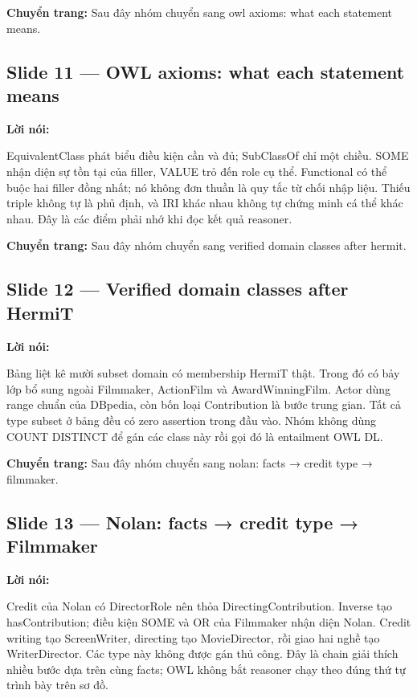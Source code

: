 \documentclass[
  11pt,
]{article}
\begin{document}
\textbf{Chuyển trang:} Sau đây nhóm chuyển sang owl axioms: what each
statement means.

\subsection{Slide 11 --- OWL axioms: what each statement
means}\label{slide-11-owl-axioms-what-each-statement-means}

\textbf{Lời nói:}

Equivale\allowbreak{}nt\allowbreak{}Class phát biểu điều kiện cần và đủ;
SubClassOf chỉ một chiều. SOME nhận diện sự tồn tại của filler, VALUE
trỏ đến role cụ thể. Functional có thể buộc hai filler đồng nhất; nó
không đơn thuần là quy tắc từ chối nhập liệu. Thiếu triple không tự là
phủ định, và IRI khác nhau không tự chứng minh cá thể khác nhau. Đây là
các điểm phải nhớ khi đọc kết quả reasoner.

\textbf{Chuyển trang:} Sau đây nhóm chuyển sang verified domain classes
after hermit.

\subsection{Slide 12 --- Verified domain classes after
HermiT}\label{slide-12-verified-domain-classes-after-hermit}

\textbf{Lời nói:}

Bảng liệt kê mười subset domain có membership HermiT thật. Trong đó có
bảy lớp bổ sung ngoài Filmmaker, ActionFilm và
Award\allowbreak{}Win\allowbreak{}ning\allowbreak{}Film\allowbreak{}.\allowbreak{}
Actor dùng range chuẩn của DBpedia, còn bốn loại Contribution là bước
trung gian. Tất cả type subset ở bảng đều có zero assertion trong đầu
vào. Nhóm không dùng COUNT DISTINCT để gán các class này rồi gọi đó là
entailment OWL DL.

\textbf{Chuyển trang:} Sau đây nhóm chuyển sang nolan: facts → credit
type → filmmaker.

\subsection{Slide 13 --- Nolan: facts → credit type →
Filmmaker}\label{slide-13-nolan-facts-credit-type-filmmaker}

\textbf{Lời nói:}

Credit của Nolan có DirectorRole nên thỏa
Directin\allowbreak{}g\allowbreak{}Contrib\allowbreak{}ution.\allowbreak{}
Inverse tạo has\allowbreak{}Contr\allowbreak{}ibution;\allowbreak{} điều
kiện SOME và OR của Filmmaker nhận diện Nolan. Credit writing tạo
Screen\allowbreak{}Wr\allowbreak{}iter, directing tạo
Movie\allowbreak{}Dir\allowbreak{}ector, rồi giao hai nghề tạo
Writer\allowbreak{}Di\allowbreak{}rector.\allowbreak{} Các type này
không được gán thủ công. Đây là chain giải thích nhiều bước dựa trên
cùng facts; OWL không bắt reasoner chạy theo đúng thứ tự trình bày trên
sơ đồ.
\end{document}
